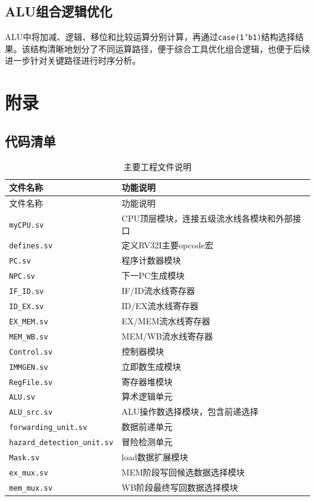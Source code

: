 \documentclass[UTF8,a4paper,12pt]{ctexart}
\newcommand{\code}[1]{\texttt{#1}}
\begin{document}
\subsection{ALU组合逻辑优化}

ALU中将加减、逻辑、移位和比较运算分别计算，再通过\code{case(1'b1)}结构选择结果。该结构清晰地划分了不同运算路径，便于综合工具优化组合逻辑，也便于后续进一步针对关键路径进行时序分析。

\section{附录}

\subsection{代码清单}

\begin{longtable}{p{5cm}p{9cm}}
\caption{主要工程文件说明}\\
\toprule
文件名称 & 功能说明 \\
\midrule
\endfirsthead
\toprule
文件名称 & 功能说明 \\
\midrule
\endhead
\code{myCPU.sv} & CPU顶层模块，连接五级流水线各模块和外部接口 \\
\code{defines.sv} & 定义RV32I主要opcode宏 \\
\code{PC.sv} & 程序计数器模块 \\
\code{NPC.sv} & 下一PC生成模块 \\
\code{IF\_ID.sv} & IF/ID流水线寄存器 \\
\code{ID\_EX.sv} & ID/EX流水线寄存器 \\
\code{EX\_MEM.sv} & EX/MEM流水线寄存器 \\
\code{MEM\_WB.sv} & MEM/WB流水线寄存器 \\
\code{Control.sv} & 控制器模块 \\
\code{IMMGEN.sv} & 立即数生成模块 \\
\code{RegFile.sv} & 寄存器堆模块 \\
\code{ALU.sv} & 算术逻辑单元 \\
\code{ALU\_src.sv} & ALU操作数选择模块，包含前递选择 \\
\code{forwarding\_unit.sv} & 数据前递单元 \\
\code{hazard\_detection\_unit.sv} & 冒险检测单元 \\
\code{Mask.sv} & load数据扩展模块 \\
\code{ex\_mux.sv} & MEM阶段写回候选数据选择模块 \\
\code{mem\_mux.sv} & WB阶段最终写回数据选择模块 \\
\bottomrule
\end{longtable}
\end{document}
